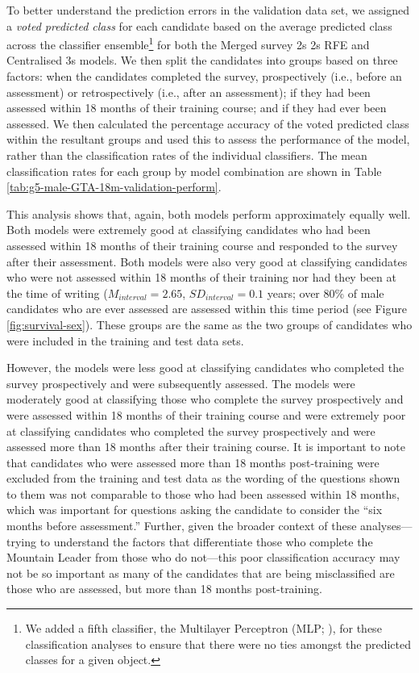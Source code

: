 \documentclass[
  12pt,
  a4paper,
]{book}
\begin{document}
To better understand the prediction errors in the validation data set, we assigned a \emph{voted predicted class} for each candidate based on the average predicted class across the classifier ensemble\footnote{We added a fifth classifier, the Multilayer Perceptron (MLP; \citet{Bishop2006}), for these classification analyses to ensure that there were no ties amongst the predicted classes for a given object.} for both the Merged survey 2s 2s RFE and Centralised 3s models. We then split the candidates into groups based on three factors: when the candidates completed the survey, prospectively (i.e., before an assessment) or retrospectively (i.e., after an assessment); if they had been assessed within 18 months of their training course; and if they had ever been assessed. We then calculated the percentage accuracy of the voted predicted class within the resultant groups and used this to assess the performance of the model, rather than the classification rates of the individual classifiers. The mean classification rates for each group by model combination are shown in Table \ref{tab:g5-male-GTA-18m-validation-perform}.

This analysis shows that, again, both models perform approximately equally well. Both models were extremely good at classifying candidates who had been assessed within 18 months of their training course and responded to the survey after their assessment. Both models were also very good at classifying candidates who were not assessed within 18 months of their training nor had they been at the time of writing (\(M_{interval} = 2.65\), \(SD_{interval} = 0.1\) years; over 80\% of male candidates who are ever assessed are assessed within this time period (see Figure \ref{fig:survival-sex}). These groups are the same as the two groups of candidates who were included in the training and test data sets.

However, the models were less good at classifying candidates who completed the survey prospectively and were subsequently assessed. The models were moderately good at classifying those who complete the survey prospectively and were assessed within 18 months of their training course and were extremely poor at classifying candidates who completed the survey prospectively and were assessed more than 18 months after their training course. It is important to note that candidates who were assessed more than 18 months post-training were excluded from the training and test data as the wording of the questions shown to them was not comparable to those who had been assessed within 18 months, which was important for questions asking the candidate to consider the ``six months before assessment.'' Further, given the broader context of these analyses---trying to understand the factors that differentiate those who complete the Mountain Leader from those who do not---this poor classification accuracy may not be so important as many of the candidates that are being misclassified are those who are assessed, but more than 18 months post-training.
\end{document}
